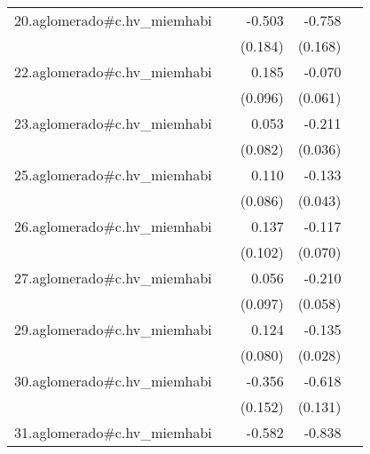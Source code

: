 {\begin{longtable}{l*{4}{D{.}{.}{-1}}}
\addlinespace
20.aglomerado#c.hv\_miemhabi&                     &      -0.503\sym{**} &      -0.758\sym{***}&                     \\
            &                     &     (0.184)         &     (0.168)         &                     \\
\addlinespace
22.aglomerado#c.hv\_miemhabi&                     &       0.185         &      -0.070         &                     \\
            &                     &     (0.096)         &     (0.061)         &                     \\
\addlinespace
23.aglomerado#c.hv\_miemhabi&                     &       0.053         &      -0.211\sym{***}&                     \\
            &                     &     (0.082)         &     (0.036)         &                     \\
\addlinespace
25.aglomerado#c.hv\_miemhabi&                     &       0.110         &      -0.133\sym{**} &                     \\
            &                     &     (0.086)         &     (0.043)         &                     \\
\addlinespace
26.aglomerado#c.hv\_miemhabi&                     &       0.137         &      -0.117         &                     \\
            &                     &     (0.102)         &     (0.070)         &                     \\
\addlinespace
27.aglomerado#c.hv\_miemhabi&                     &       0.056         &      -0.210\sym{***}&                     \\
            &                     &     (0.097)         &     (0.058)         &                     \\
\addlinespace
29.aglomerado#c.hv\_miemhabi&                     &       0.124         &      -0.135\sym{***}&                     \\
            &                     &     (0.080)         &     (0.028)         &                     \\
\addlinespace
30.aglomerado#c.hv\_miemhabi&                     &      -0.356\sym{*}  &      -0.618\sym{***}&                     \\
            &                     &     (0.152)         &     (0.131)         &                     \\
\addlinespace
31.aglomerado#c.hv\_miemhabi&                     &      -0.582\sym{***}&      -0.838\sym{***}&                     \\

\end{longtable}}
